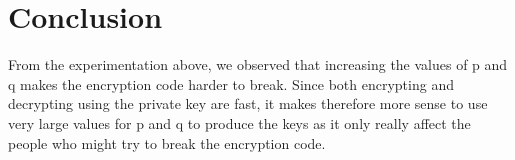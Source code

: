 \documentclass[12pt]{article}
\begin{document}
	\section{Conclusion}
		From the experimentation above, we observed that increasing the values of p and q makes the encryption code harder to break. Since both encrypting and decrypting using the private key are fast, it makes therefore more sense to use very large values for p and q to produce the keys as it only really affect the people who might try to break the encryption code.
		
	
\end{document}
